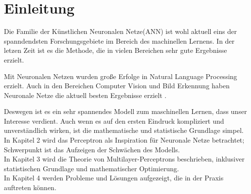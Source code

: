 
\section{Einleitung}
Die Familie der Künstlichen Neuronalen Netze(ANN) ist wohl aktuell eins der spanndendsten Forschungsgebiete im Bereich des machinellen Lernens. In der letzen Zeit ist es die Methode, die in vielen Bereichen sehr gute Ergebnisse erzielt. 

Mit Neuronalen Netzen wurden große Erfolge in Natural Language Processing erzielt. Auch in den Bereichen Computer Vision und Bild Erkennung haben Neuronale Netze die aktuell besten Ergebnisse erzielt \cite{LeCun2015}.

Deswegen ist es ein sehr spannendes Modell zum maschinellen Lernen, dass unser Interesse verdient. Auch wenn es auf den ersten Eindruck kompliziert und unverständlich wirken, ist die mathematische und statistische Grundlage simpel.\\
In Kapitel 2 wird das Perceptron als Inspiration für Neuronale Netze betrachtet; Schwerpunkt ist das Aufzeigen der Schwächen des Modells. \\
In Kapitel 3 wird die Theorie von Multilayer-Perceptrons beschrieben, inklusiver statistischen Grundlage und mathematischer Optimierung. \\
In Kapitel 4 werden Probleme und Lösungen aufgezeigt, die in der Praxis auftreten können.
